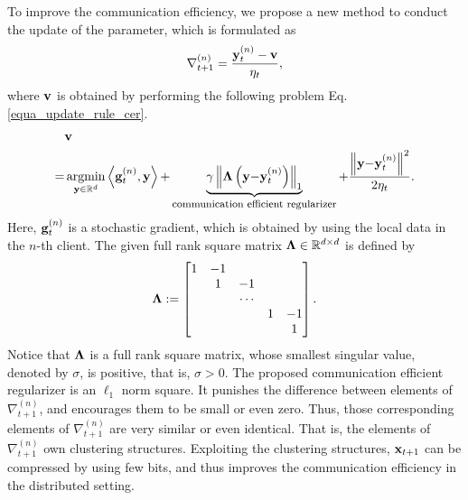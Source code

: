 \documentclass[journal]{IEEEtran}
\begin{document}
To improve the communication efficiency, we propose a new method to conduct the update of the parameter, which is formulated as
\begin{align}
\nonumber
\nabla_{t+1}^{(n)} = \frac{{\bf y}_t^{(n)} - {\bf v}}{\eta_t}, 
\end{align} where ${\bf v}$ is obtained by performing the following problem Eq. \ref{equa_update_rule_cer}.
\begin{align}
\label{equa_update_rule_cer}
\nonumber
& \v \\ \nonumber
= & \argmin_{\y\in\RR^d} \lrangle {\g^{(n)}_t, \y} \mathrm{+} \underbrace{\gamma \lrnorm{\bLambda\lrincir{\y \mathrm{-} \y_t^{(n)}}}_1}_{\text{\scriptsize  communication efficient  regularizer}} \mathrm{+} \frac{\lrnorm{\y \mathrm{-} \y_t^{(n)}}^2}{2\eta_t}. 
\end{align}  Here, ${\bf g}^{(n)}_t$ is a stochastic gradient, which is obtained by using the local data in the $n$-th client. The given full rank square matrix $\mathbf{\Lambda}\in\mathbb{R}^{d\times d}$ is defined by
\begin{align}
\nonumber
\mathbf{\Lambda} := \begin{bmatrix}
 1&  -1&  &  & \\ 
 &  1&  -1&  & \\ 
 &  &   \cdots &  & \\ 
 &  &  & 1 & -1 \\ 
 &  &  &  & 1
\end{bmatrix}.
\end{align} Notice that $\mathbf{\Lambda}$ is a full rank square matrix, whose smallest singular value, denoted by $\sigma$,  is positive, that is, $\sigma > 0$. The proposed communication efficient regularizer is an $\ell_1$ norm square. It punishes the difference between elements of $\nabla_{t+1}^{(n)}$, and encourages them  to be small or even zero. Thus, those corresponding elements of $\nabla_{t+1}^{(n)}$ are very similar or even identical. That is, the elements of $\nabla_{t+1}^{(n)}$ own clustering structures. Exploiting the clustering structures, ${\bf x}_{t+1}$ can be compressed by using few bits, and thus improves the communication efficiency in the distributed setting.
\end{document}
